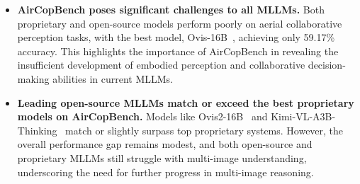 \documentclass[letterpaper]{article} %
\begin{document}
\begin{itemize}[left=0pt]
    \item \textbf{AirCopBench poses significant challenges to all MLLMs.}
    Both proprietary and open-source models perform poorly on aerial collaborative perception tasks, with the best model, Ovis-16B~\cite{lu2024ovis}, achieving only 59.17\% accuracy. This highlights the importance of AirCopBench in revealing the insufficient development of embodied perception and collaborative decision-making abilities in current MLLMs.

    \item \textbf{Leading open-source MLLMs match or exceed the best proprietary models on AirCopBench.}
    Models like Ovis2-16B~\cite{lu2024ovis} and Kimi-VL-A3B-Thinking~\cite{team2025kimi} match or slightly surpass top proprietary systems. However, the overall performance gap remains modest, and both open-source and proprietary MLLMs still struggle with multi-image understanding, underscoring the need for further progress in multi-image reasoning.
    
    



\end{itemize}
\end{document}
